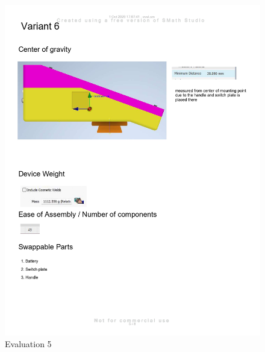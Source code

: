 \begin{figure}[H]
    \centering
    \includegraphics[width=\linewidth]{texs/appendix/data/evaluation/eval_page-0005.jpg}
    \caption{Evaluation 5}
    \label{fig:evaluation-5}
\end{figure}


